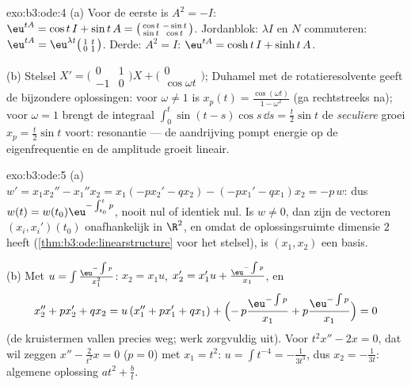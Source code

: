 \begin{solution}{exo:b3:ode:4}
(a) Voor de eerste is $A^2 = -I$: $\eu^{tA} = \cos t\,I + \sin
t\,A = \bigl(\begin{smallmatrix}\cos t & -\sin t\\ \sin t &
\cos t\end{smallmatrix}\bigr)$. Jordanblok: $\lambda I$ en $N$
commuteren: $\eu^{tA} = \eu^{\lambda t}\bigl(
\begin{smallmatrix}1 & t\\ 0 & 1\end{smallmatrix}\bigr)$. Derde:
$A^2 = I$: $\eu^{tA} = \cosh t\,I + \sinh t\,A$.

(b) Stelsel $X' = \bigl(\begin{smallmatrix}0&1\\-1&0
\end{smallmatrix}\bigr)X + \bigl(\begin{smallmatrix}0\\
\cos\omega t\end{smallmatrix}\bigr)$; Duhamel met de
rotatieresolvente geeft de bijzondere oplossingen: voor $\omega
\neq 1$ is $x_p(t) = \frac{\cos(\omega t)}{1 - \omega^2}$ (ga
rechtstreeks na); voor $\omega = 1$ brengt de integraal
$\int_0^t\sin(t - s)\cos s\,\dd s = \frac t2\sin t$ de
\emph{seculiere} groei $x_p = \frac t2\sin t$ voort: resonantie
--- de aandrijving pompt energie op de eigenfrequentie en de
amplitude groeit lineair.
\end{solution}

\begin{solution}{exo:b3:ode:5}
(a) $w' = x_1x_2'' - x_1''x_2 = x_1(-px_2' - qx_2) - (-px_1' -
qx_1)x_2 = -p\,w$: dus $w(t) = w(t_0)\eu^{-\int_{t_0}^tp}$,
nooit nul of identiek nul. Is $w \neq 0$, dan zijn de vectoren
$(x_i, x_i')(t_0)$ onafhankelijk in $\R^2$, en omdat de
oplossingsruimte dimensie $2$ heeft
(\cref{thm:b3:ode:linearstructure} voor het stelsel), is $(x_1,
x_2)$ een basis.

(b) Met $u = \int\frac{\eu^{-\int p}}{x_1^2}$: $x_2 = x_1u$,
$x_2' = x_1'u + \frac{\eu^{-\int p}}{x_1}$, en
\[
x_2'' + px_2' + qx_2
= u\,(x_1'' + px_1' + qx_1) +
\Bigl(-\,p\frac{\eu^{-\int p}}{x_1} +
p\frac{\eu^{-\int p}}{x_1}\Bigr) = 0
\]
(de kruistermen vallen precies weg; werk zorgvuldig uit). Voor
$t^2x'' - 2x = 0$, dat wil zeggen $x'' - \frac2{t^2}x = 0$ ($p =
0$) met $x_1 = t^2$: $u = \int t^{-4} = -\frac1{3t^3}$, dus $x_2
= -\frac1{3t}$: algemene oplossing $at^2 + \frac bt$.
\end{solution}


